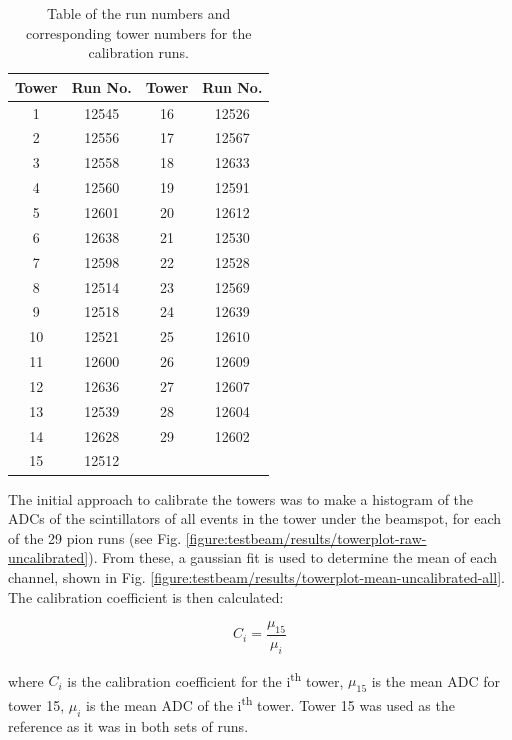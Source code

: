 \begin{table}[h]
\centering
	\begin{tabular}{ c c | c c }
	\hline \hline
	\textbf{Tower} & \textbf{Run No.} & \textbf{Tower} & \textbf{Run No.} \\ \hline \hline
	 1 & 12545 & 16 & 12526 \\
	 2 & 12556 & 17 & 12567 \\
	 3 & 12558 & 18 & 12633 \\
	 4 & 12560 & 19 & 12591 \\
	 5 & 12601 & 20 & 12612 \\
	 6 & 12638 & 21 & 12530 \\
	 7 & 12598 & 22 & 12528 \\
	 8 & 12514 & 23 & 12569 \\
	 9 & 12518 & 24 & 12639 \\
	10 & 12521 & 25 & 12610 \\
	11 & 12600 & 26 & 12609 \\
	12 & 12636 & 27 & 12607 \\
	13 & 12539 & 28 & 12604 \\
	14 & 12628 & 29 & 12602 \\
	15 & 12512 &    &    \\ \hline
	\end{tabular}
	\caption{Table of the run numbers and corresponding tower numbers for the calibration runs.}
	\label{table:idea/calibrationruns}
\end{table}

The initial approach to calibrate the towers was to make a histogram of the \acrshort{ADC}s of the scintillators of all events in the tower under the beamspot, for each of the 29 pion runs (see Fig. \ref{figure:testbeam/results/towerplot-raw-uncalibrated}). From these, a gaussian fit is used to determine the mean of each channel, shown in Fig. \ref{figure:testbeam/results/towerplot-mean-uncalibrated-all}. The calibration coefficient is then calculated:

\begin{equation}
	C_i = \frac{\mu_{15}}{\mu_i}
\label{eq:calibration-coeff}
\end{equation}

where $C_i$ is the calibration coefficient for the i\textsuperscript{th} tower, $\mu_{15}$ is the mean \acrshort{ADC} for tower 15, $\mu_i$ is the mean \acrshort{ADC} of the i\textsuperscript{th} tower. Tower 15 was used as the reference as it was in both sets of runs.

